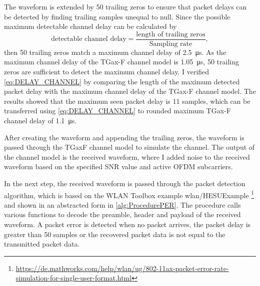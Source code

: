 The waveform is extended by
\num{50} trailing zeros to ensure that packet delays can be detected by finding trailing samples unequal to null.
Since the possible maximum detectable channel delay can be calculated by
\begin{equation}\label{eq:DELAY_CHANNEL}
   \text{detectable channel delay} =
   \frac{
      \text{length of trailing zeros}
   }{
      \text{Sampling rate}
   }
   ,
\end{equation}
then \num{50} trailing zeros match a maximum channel delay of \SI{2.5}{\micro\second}.
As the maximum channel delay of the TGax-F channel model is \SI{1.05}{\micro\second},
\num{50} trailing zeros are sufficient to detect the maximum channel delay.
I verified \autoref{eq:DELAY_CHANNEL} by comparing
the length of the maximum detected packet delay with the maximum channel delay of the TGax-F channel model.
The results showed that the maximum seen packet delay is \num{11} samples,
which can be transferred using \autoref{eq:DELAY_CHANNEL} to rounded maximum TGax-F channel delay of \SI{1.1}{\micro\second}.

After creating the waveform and appending the trailing zeros, the waveform is passed through the TGaxF channel model to simulate the channel.
The output of the channel model is the received waveform, where I added noise to the received waveform based on the
specified \ac{SNR} value and active \ac{OFDM} subcarriers.

In the next step, the received waveform is passed through the packet detection algorithm, which is based on the
WLAN Toolbox example wlan/HESUExample \footnote{\url{https://de.mathworks.com/help/wlan/ug/802-11ax-packet-error-rate-simulation-for-single-user-format.html}} and
shown in an abstracted form in \autoref{alg:ProcedurePER}.
The procedure calls various functions to decode the preamble, header and payload of
the received waveform.
A packet error is detected when no packet arrives, the packet delay is greater than \num{50} samples or the recovered packet data
is not equal to the transmitted packet data.

